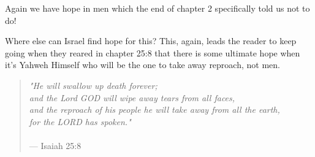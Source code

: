 \documentclass[11pt]{article}
\begin{document}
Again we have hope in men which the end of chapter 2 specifically told us not to do!

Where else can Israel find hope for this? This, again, leads the reader to keep going when they reared
in chapter 25:8 that there is some ultimate hope when it's Yahweh Himself who will be the one to take away reproach, not men.

{\vspace{2em}}

\begin{quote}
\textit{"He will swallow up death forever;\\ and the Lord GOD will wipe away tears from all faces,\\ and the reproach of his people he will take away from all the earth,\\ for the LORD has spoken."}\\\\
\hfill --- Isaiah 25:8
\end{quote}
\end{document}
